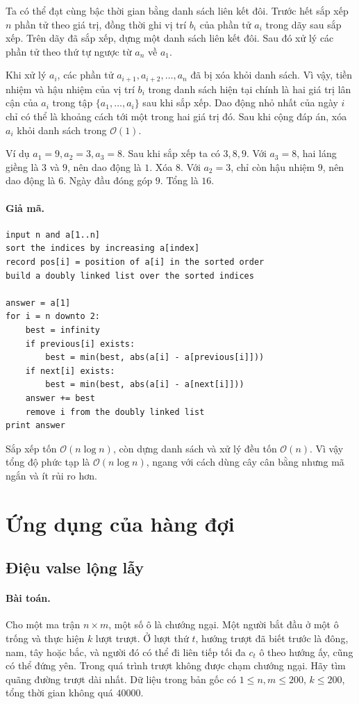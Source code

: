 \documentclass[11pt]{article}
\newcommand{\Oh}{\mathcal{O}}
\begin{document}
Ta có thể đạt cùng bậc thời gian bằng danh sách liên kết đôi. Trước hết sắp
xếp \(n\) phần tử theo giá trị, đồng thời ghi vị trí \(b_i\) của phần tử
\(a_i\) trong dãy sau sắp xếp. Trên dãy đã sắp xếp, dựng một danh sách liên
kết đôi. Sau đó xử lý các phần tử theo thứ tự ngược từ \(a_n\) về \(a_1\).

Khi xử lý \(a_i\), các phần tử \(a_{i+1},a_{i+2},\ldots,a_n\) đã bị xóa khỏi
danh sách. Vì vậy, tiền nhiệm và hậu nhiệm của vị trí \(b_i\) trong danh sách
hiện tại chính là hai giá trị lân cận của \(a_i\) trong tập
\(\{a_1,\ldots,a_i\}\) sau khi sắp xếp. Dao động nhỏ nhất của ngày \(i\) chỉ
có thể là khoảng cách tới một trong hai giá trị đó. Sau khi cộng đáp án, xóa
\(a_i\) khỏi danh sách trong \(\Oh(1)\).

Ví dụ \(a_1=9,a_2=3,a_3=8\). Sau khi sắp xếp ta có \(3,8,9\). Với \(a_3=8\),
hai láng giềng là \(3\) và \(9\), nên dao động là \(1\). Xóa \(8\). Với
\(a_2=3\), chỉ còn hậu nhiệm \(9\), nên dao động là \(6\). Ngày đầu đóng góp
\(9\). Tổng là \(16\).

\paragraph{Giả mã.}
\begin{verbatim}
input n and a[1..n]
sort the indices by increasing a[index]
record pos[i] = position of a[i] in the sorted order
build a doubly linked list over the sorted indices

answer = a[1]
for i = n downto 2:
    best = infinity
    if previous[i] exists:
        best = min(best, abs(a[i] - a[previous[i]]))
    if next[i] exists:
        best = min(best, abs(a[i] - a[next[i]]))
    answer += best
    remove i from the doubly linked list
print answer
\end{verbatim}

Sắp xếp tốn \(\Oh(n\log n)\), còn dựng danh sách và xử lý đều tốn
\(\Oh(n)\). Vì vậy tổng độ phức tạp là \(\Oh(n\log n)\), ngang với cách dùng
cây cân bằng nhưng mã ngắn và ít rủi ro hơn.

\section{Ứng dụng của hàng đợi}

\subsection{Điệu valse lộng lẫy}

\paragraph{Bài toán.}
Cho một ma trận \(n\times m\), một số ô là chướng ngại. Một người bắt đầu ở
một ô trống và thực hiện \(k\) lượt trượt. Ở lượt thứ \(t\), hướng trượt đã
biết trước là đông, nam, tây hoặc bắc, và người đó có thể đi liên tiếp tối đa
\(c_t\) ô theo hướng ấy, cũng có thể đứng yên. Trong quá trình trượt không
được chạm chướng ngại. Hãy tìm quãng đường trượt dài nhất. Dữ liệu trong bản
gốc có \(1\le n,m\le 200\), \(k\le 200\), tổng thời gian không quá \(40000\).
\end{document}
